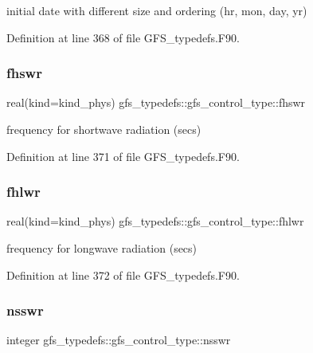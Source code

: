 initial date with different size and ordering (hr, mon, day, yr) 



Definition at line 368 of file G\+F\+S\+\_\+typedefs.\+F90.

\mbox{\label{structgfs__typedefs_1_1gfs__control__type_a1b900189dd177ae38268f20ccaf30839}} 
\subsubsection{fhswr}
{\footnotesize\ttfamily real(kind=kind\+\_\+phys) gfs\+\_\+typedefs\+::gfs\+\_\+control\+\_\+type\+::fhswr}



frequency for shortwave radiation (secs) 



Definition at line 371 of file G\+F\+S\+\_\+typedefs.\+F90.

\mbox{\label{structgfs__typedefs_1_1gfs__control__type_a86b9264ee96f15c001afc678d6357434}} 
\subsubsection{fhlwr}
{\footnotesize\ttfamily real(kind=kind\+\_\+phys) gfs\+\_\+typedefs\+::gfs\+\_\+control\+\_\+type\+::fhlwr}



frequency for longwave radiation (secs) 



Definition at line 372 of file G\+F\+S\+\_\+typedefs.\+F90.

\mbox{\label{structgfs__typedefs_1_1gfs__control__type_a35fc371233152b5c811b0e22739bb12e}} 
\subsubsection{nsswr}
{\footnotesize\ttfamily integer gfs\+\_\+typedefs\+::gfs\+\_\+control\+\_\+type\+::nsswr}




